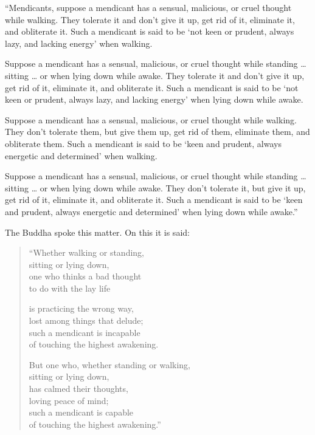 \documentclass[12pt,openany]{book}%
\begin{document}
“Mendicants, suppose a mendicant has a sensual, malicious, or cruel thought while walking. They tolerate it and don’t give it up, get rid of it, eliminate it, and obliterate it. Such a mendicant is said to be ‘not keen or prudent, always lazy, and lacking energy’ when walking. 

Suppose a mendicant has a sensual, malicious, or cruel thought while standing … sitting … or when lying down while awake. They tolerate it and don’t give it up, get rid of it, eliminate it, and obliterate it. Such a mendicant is said to be ‘not keen or prudent, always lazy, and lacking energy’ when lying down while awake. 

Suppose a mendicant has a sensual, malicious, or cruel thought while walking. They don’t tolerate them, but give them up, get rid of them, eliminate them, and obliterate them. Such a mendicant is said to be ‘keen and prudent, always energetic and determined’ when walking. 

Suppose a mendicant has a sensual, malicious, or cruel thought while standing … sitting … or when lying down while awake. They don’t tolerate it, but give it up, get rid of it, eliminate it, and obliterate it. Such a mendicant is said to be ‘keen and prudent, always energetic and determined’ when lying down while awake.” 

The Buddha spoke this matter. On this it is said: 

\begin{verse}%
“Whether walking or standing, \\
sitting or lying down, \\
one who thinks a bad thought \\
to do with the lay life 

is practicing the wrong way, \\
lost among things that delude; \\
such a mendicant is incapable \\
of touching the highest awakening. 

But one who, whether standing or walking, \\
sitting or lying down, \\
has calmed their thoughts, \\
loving peace of mind; \\
such a mendicant is capable \\
of touching the highest awakening.” 

%
\end{verse}
\end{document}
